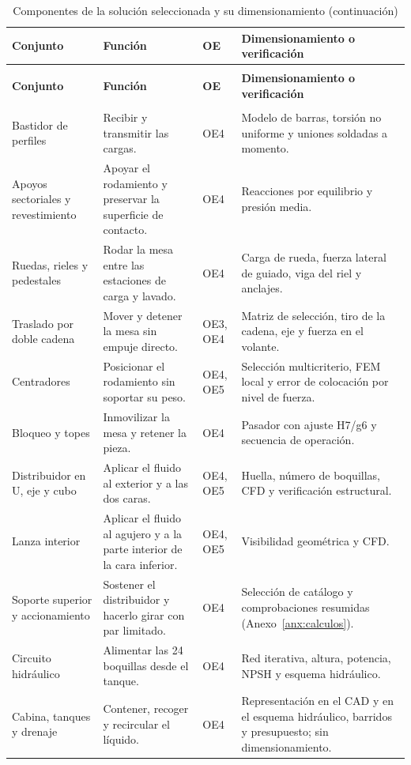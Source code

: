\begingroup
\small\singlespacing
\setlength{\parskip}{0pt}
\setlength{\tabcolsep}{4pt}
\renewcommand{\arraystretch}{1.1}
\begin{longtable}{@{}>{\raggedright\arraybackslash}p{2.8cm}>{\raggedright\arraybackslash}p{}>{\raggedright\arraybackslash}p{}>{\raggedright\arraybackslash}p{}@{}}
\caption{Componentes de la solución seleccionada y su dimensionamiento}\label{tab:componentes_revision}\\
\toprule
\textbf{Conjunto} & \textbf{Función} & \textbf{OE} & \textbf{Dimensionamiento o verificación}\\
\midrule\endfirsthead
\caption[]{Componentes de la solución seleccionada y su dimensionamiento (continuación)}\\
\toprule
\textbf{Conjunto} & \textbf{Función} & \textbf{OE} & \textbf{Dimensionamiento o verificación}\\
\midrule\endhead
\midrule\multicolumn{4}{r}{\textit{Continúa en la página siguiente.}}\\\endfoot
\bottomrule\endlastfoot
Bastidor de perfiles & Recibir y transmitir las cargas. & OE4 & Modelo de barras, torsión no uniforme y uniones soldadas a momento.\\
Apoyos sectoriales y revestimiento & Apoyar el rodamiento y preservar la superficie de contacto. & OE4 & Reacciones por equilibrio y presión media.\\
Ruedas, rieles y pedestales & Rodar la mesa entre las estaciones de carga y lavado. & OE4 & Carga de rueda, fuerza lateral de guiado, viga del riel y anclajes.\\
Traslado por doble cadena & Mover y detener la mesa sin empuje directo. & OE3, OE4 & Matriz de selección, tiro de la cadena, eje y fuerza en el volante.\\
Centradores & Posicionar el rodamiento sin soportar su peso. & OE4, OE5 & Selección multicriterio, FEM local y error de colocación por nivel de fuerza.\\
Bloqueo y topes & Inmovilizar la mesa y retener la pieza. & OE4 & Pasador con ajuste H7/g6 y secuencia de operación.\\
Distribuidor en U, eje y cubo & Aplicar el fluido al exterior y a las dos caras. & OE4, OE5 & Huella, número de boquillas, CFD y verificación estructural.\\
Lanza interior & Aplicar el fluido al agujero y a la parte interior de la cara inferior. & OE4, OE5 & Visibilidad geométrica y CFD.\\
Soporte superior y accionamiento & Sostener el distribuidor y hacerlo girar con par limitado. & OE4 & Selección de catálogo y comprobaciones resumidas (Anexo~\ref{anx:calculos}).\\
Circuito hidráulico & Alimentar las 24 boquillas desde el tanque. & OE4 & Red iterativa, altura, potencia, NPSH y esquema hidráulico.\\
Cabina, tanques y drenaje & Contener, recoger y recircular el líquido. & OE4 & Representación en el CAD y en el esquema hidráulico, barridos y presupuesto; sin dimensionamiento.\\
\end{longtable}
